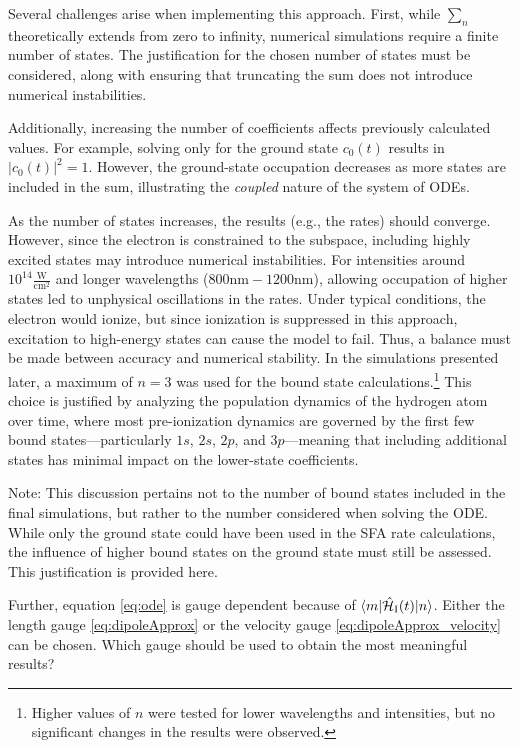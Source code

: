 \medskip
Several challenges arise when implementing this approach.
First, while $\sum_n$ theoretically extends from zero to infinity, numerical simulations require a finite number of states.
The justification for the chosen number of states must be considered, along with ensuring that truncating the sum does not introduce numerical instabilities.

Additionally, increasing the number of coefficients affects previously calculated values.
For example, solving only for the ground state $c_0(t)$ results in $|c_0(t)|^2 = 1$.
However, the ground-state occupation decreases as more states are included in the sum, illustrating the \emph{coupled} nature of the system of ODEs.

As the number of states increases, the results (e.g., the rates) should converge.
However, since the electron is constrained to the subspace, including highly excited states may introduce numerical instabilities.
For intensities around $10^{14}\frac{\mathrm{W}}{\mathrm{cm}^2}$ and longer wavelengths ($800\mathrm{nm}-1200\mathrm{nm}$), allowing occupation of higher states led to unphysical oscillations in the rates.
Under typical conditions, the electron would ionize, but since ionization is suppressed in this approach, excitation to high-energy states can cause the model to fail.
Thus, a balance must be made between accuracy and numerical stability.
In the simulations presented later, a maximum of $n=3$ was used for the bound state calculations.\footnote{Higher values of $n$ were tested for lower wavelengths and intensities, but no significant changes in the results were observed.}
This choice is justified by analyzing the population dynamics of the hydrogen atom over time, where most pre-ionization dynamics are governed by the first few bound states—particularly $1s$, $2s$, $2p$, and $3p$—meaning that including additional states has minimal impact on the lower-state coefficients.

Note: This discussion pertains not to the number of bound states included in the final simulations, but rather to the number considered when solving the ODE.
While only the ground state could have been used in the SFA rate calculations, the influence of higher bound states on the ground state must still be assessed.
This justification is provided here.




\medskip
Further, equation \eqref{eq:ode} is gauge dependent because of $\braket{m|\hat{\mathcal{H}}_{\mathrm{I}}(t)|n}$.
Either the length gauge \eqref{eq:dipoleApprox} or the velocity gauge \eqref{eq:dipoleApprox_velocity} can be chosen.
Which gauge should be used to obtain the most meaningful results?

